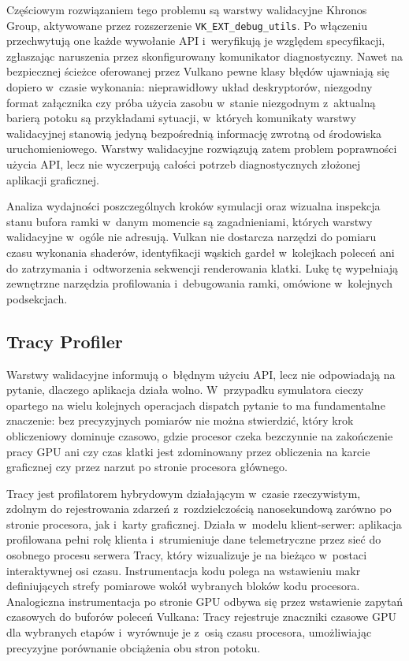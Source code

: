 Częściowym rozwiązaniem tego problemu są warstwy walidacyjne Khronos Group, aktywowane
przez rozszerzenie \texttt{VK\_EXT\_debug\_utils}. Po włączeniu przechwytują one każde
wywołanie API i~weryfikują je względem specyfikacji, zgłaszając naruszenia przez
skonfigurowany komunikator diagnostyczny. Nawet na bezpiecznej ścieżce oferowanej przez
Vulkano pewne klasy błędów ujawniają się dopiero w~czasie wykonania: nieprawidłowy układ
deskryptorów, niezgodny format załącznika czy próba użycia zasobu w~stanie niezgodnym
z~aktualną barierą potoku są przykładami sytuacji, w~których komunikaty warstwy walidacyjnej
stanowią jedyną bezpośrednią informację zwrotną od środowiska uruchomieniowego.
Warstwy walidacyjne rozwiązują zatem problem poprawności użycia API, lecz nie wyczerpują
całości potrzeb diagnostycznych złożonej aplikacji graficznej.

Analiza wydajności poszczególnych kroków symulacji oraz wizualna inspekcja stanu
bufora ramki w~danym momencie są zagadnieniami, których warstwy walidacyjne w~ogóle nie
adresują. Vulkan nie dostarcza narzędzi do pomiaru czasu wykonania shaderów, identyfikacji
wąskich gardeł w~kolejkach poleceń ani do zatrzymania i~odtworzenia sekwencji renderowania
klatki. Lukę tę wypełniają zewnętrzne narzędzia profilowania i~debugowania ramki,
omówione w~kolejnych podsekcjach.

\subsection{Tracy Profiler}

Warstwy walidacyjne informują o~błędnym użyciu API, lecz nie odpowiadają na pytanie,
dlaczego aplikacja działa wolno. W~przypadku symulatora cieczy opartego na wielu
kolejnych operacjach dispatch pytanie to ma fundamentalne znaczenie: bez precyzyjnych
pomiarów nie można stwierdzić, który krok obliczeniowy dominuje czasowo, gdzie procesor
czeka bezczynnie na zakończenie pracy GPU ani czy czas klatki jest zdominowany przez
obliczenia na karcie graficznej czy przez narzut po stronie procesora głównego.

Tracy \cite{tracy-profiler} jest profilatorem hybrydowym działającym w~czasie rzeczywistym,
zdolnym do rejestrowania zdarzeń z~rozdzielczością nanosekundową zarówno po stronie
procesora, jak i~karty graficznej. Działa w~modelu klient-serwer: aplikacja profilowana
pełni rolę klienta i~strumieniuje dane telemetryczne przez sieć do osobnego procesu serwera
Tracy, który wizualizuje je na bieżąco w~postaci interaktywnej osi czasu. Instrumentacja
kodu polega na wstawieniu makr definiujących strefy pomiarowe wokół wybranych bloków
kodu procesora. Analogiczna instrumentacja po stronie GPU odbywa się przez wstawienie
zapytań czasowych do buforów poleceń Vulkana: Tracy rejestruje znaczniki czasowe GPU
dla wybranych etapów i~wyrównuje je z~osią czasu procesora, umożliwiając precyzyjne
porównanie obciążenia obu stron potoku.

